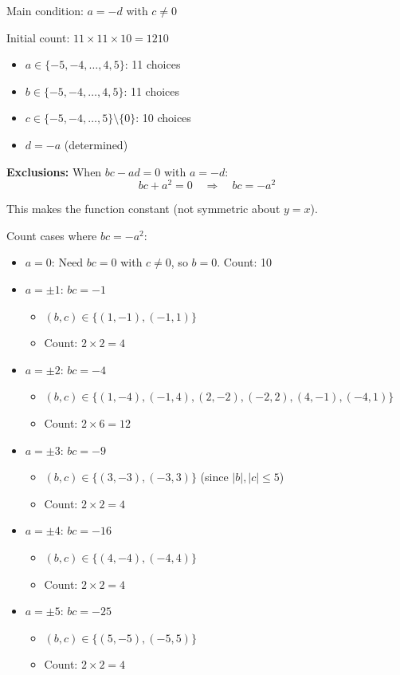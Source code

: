 \documentclass[12pt]{article}
\begin{document}
Main condition: $a = -d$ with $c \neq 0$

Initial count: $11 \times 11 \times 10 = 1210$
\begin{itemize}
    \item $a \in \{-5, -4, \ldots, 4, 5\}$: 11 choices
    \item $b \in \{-5, -4, \ldots, 4, 5\}$: 11 choices
    \item $c \in \{-5, -4, \ldots, 5\} \setminus \{0\}$: 10 choices
    \item $d = -a$ (determined)
\end{itemize}

\textbf{Exclusions:} When $bc - ad = 0$ with $a = -d$:
\[bc + a^2 = 0 \quad \Rightarrow \quad bc = -a^2\]

This makes the function constant (not symmetric about $y=x$).

Count cases where $bc = -a^2$:

\begin{itemize}
    \item $a=0$: Need $bc=0$ with $c \neq 0$, so $b=0$. Count: 10
    \item $a=\pm 1$: $bc = -1$
    \begin{itemize}
        \item $(b,c) \in \{(1,-1), (-1,1)\}$
        \item Count: $2 \times 2 = 4$
    \end{itemize}
    \item $a=\pm 2$: $bc = -4$
    \begin{itemize}
        \item $(b,c) \in \{(1,-4), (-1,4), (2,-2), (-2,2), (4,-1), (-4,1)\}$
        \item Count: $2 \times 6 = 12$
    \end{itemize}
    \item $a=\pm 3$: $bc = -9$
    \begin{itemize}
        \item $(b,c) \in \{(3,-3), (-3,3)\}$ (since $|b|, |c| \leq 5$)
        \item Count: $2 \times 2 = 4$
    \end{itemize}
    \item $a=\pm 4$: $bc = -16$
    \begin{itemize}
        \item $(b,c) \in \{(4,-4), (-4,4)\}$
        \item Count: $2 \times 2 = 4$
    \end{itemize}
    \item $a=\pm 5$: $bc = -25$
    \begin{itemize}
        \item $(b,c) \in \{(5,-5), (-5,5)\}$
        \item Count: $2 \times 2 = 4$
    \end{itemize}
\end{itemize}
\end{document}
